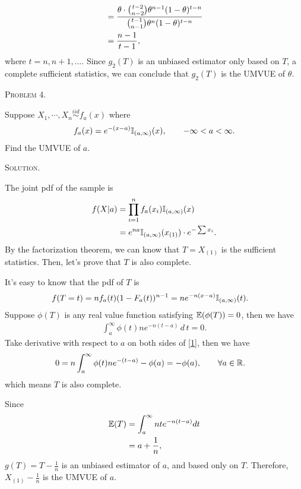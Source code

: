 \documentclass{article}
\begin{document}
\begin{CJK}{UTF8}{gbsn}
\begin{itemize}
\begin{align}
                         & = \frac{\theta \cdot \binom{t-2}{n-2}\theta^{n-1}(1-\theta)^{t-n}}{\binom{t-1}{n-1}\theta^n(1-\theta)^{t-n}} \notag \\
                         & = \frac{n-1}{t-1},\notag
              \end{align}
              where $t = n, n+1, \ldots$.
              Since $g_2(T)$ is an unbiased estimator only based on $T$, a complete sufficient statistics, we can conclude that
              $g_2(T)$ is the UMVUE of $\theta$.
    \end{itemize}





    \begin{shaded}
        \noindent\textsc{Problem 4.}\par
        Suppose $X_1, \cdots, X_n \mathop{\sim}\limits^{iid} f_a(x)$ where
        \begin{align}
            f_a(x) = e^{-(x-a)}{\mathbb I}_{(a, \infty)}(x), \qquad -\infty < a < \infty.
        \end{align}
        Find the UMVUE of $a$.
    \end{shaded}
    \noindent\textsc{Solution.}\par
    The joint pdf of the sample is
    \begin{align}
        f(X|a) & = \prod_{i=1}^n f_a(x_i) {\mathbb I}_{(a, \infty)}(x) \notag            \\
               & = e^{na} {\mathbb I}_{(a, \infty)}(x_{(1)}) \cdot e^{-\sum x_i}. \notag
    \end{align}
    By the factorization theorem, we can know that $T=X_{(1)}$ is the sufficient statistics.
    Then, let's prove that $T$ is also complete.

    It's easy to know that the pdf of $T$ is
    \begin{align}
        f(T=t) & = n f_a(t) (1-F_a(t))^{n-1} = n e^{-n(x-a)} {\mathbb I}_{(a, \infty)}(t).\notag
    \end{align}
    Suppose $\phi(T)$ is any real value function satisfying ${\mathbb E}(\phi(T))=0$, then we have
    \begin{align}
        \int_a^{\infty} \phi(t) n e^{-n(t-a)}\, d \, t = 0.\label{1}
    \end{align}
    Take derivative with respect to $a$ on both sides of \eqref{1}, then we have
    \begin{align}
        0 & = n \int_{a}^{\infty} \phi(t) ne^{-(t-a)} - \phi(a) = -\phi(a), \qquad \forall a \in {\mathbb R}.
    \end{align}
    which means $T$ is also complete.

    Since
    \begin{align}
        {\mathbb E}(T) & = \int_a^{\infty} nte^{-n(t-a)} dt \notag \\
               & = a + \frac{1}{n},\notag
    \end{align}
    $g(T) = T - \frac{1}{n}$ is an unbiased estimator of $a$, and based only on $T$.
    Therefore, $X_{(1)}-\frac{1}{n}$ is the UMVUE of $a$.


\end{CJK}
\end{document}
